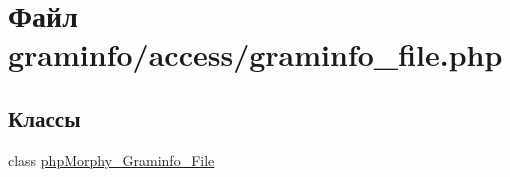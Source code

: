\hypertarget{graminfo__file_8php}{
\section{Файл graminfo/access/graminfo\_\-file.php}
\label{graminfo__file_8php}
}
\subsection*{Классы}
\begin{DoxyCompactItemize}
\item 
class \hyperlink{classphpMorphy__Graminfo__File}{phpMorphy\_\-Graminfo\_\-File}
\end{DoxyCompactItemize}
